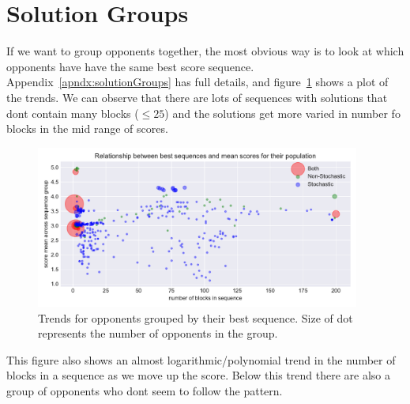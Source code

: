 \section{Solution Groups}\label{sec:solutionGroups}
If we want to group opponents together, the most obvious way is to look at which opponents have have the same best score sequence.
Appendix~\ref{apndx:solutionGroups} has full details, and figure~\ref{fig:sequence_scatter} shows a plot of the trends. 
We can observe that there are lots of sequences with solutions that dont contain many blocks ($\le 25$) and the solutions get more varied in number fo blocks in the mid range of scores.
\begin{figure}[ht]
    \includegraphics[width=0.95\textwidth, center]{./img/descriptive/sequence_scatter_colour.pdf}
    \caption{Trends for opponents grouped by their best sequence. Size of dot represents the number of opponents in the group.}\label{fig:sequence_scatter}
\end{figure}

This figure also shows an almost logarithmic/polynomial trend in the number of blocks in a sequence as we move up the score.
Below this trend there are also a group of opponents who dont seem to follow the pattern. 

